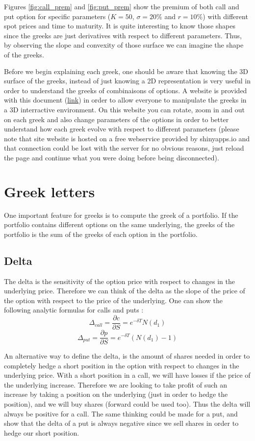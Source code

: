 \documentclass[hidelinks]{article}
\begin{document}
    
    Figures \ref{fig:call_prem} and \ref{fig:put_prem} show the premium of both call and put option for specific parameters ($K=50$, $\sigma=20\%$ and $r=10\%$) with different spot prices and time to maturity. It is quite interesting to know those shapes since the greeks are just derivatives with respect to different parameters. Thus, by observing the slope and convexity of those surface we can imagine the shape of the greeks. 
    
    Before we begin explaining each greek, one should be aware that knowing the 3D surface of the greeks, instead of just knowing a 2D representation is very useful in order to understand the greeks of combinaisons of options. A website is provided with this document (\href{https://maxencecoupet.shinyapps.io/options_greeks/}{link}) in order to allow everyone to manipulate the greeks in a 3D interractive environment. On this website you can rotate, zoom in and out on each greek and also change parameters of the options in order to better understand how each greek evolve with respect to different parameters (please note that site website is hosted on a free webservice provided by shinyapps.io and that connection could be lost with the server for no obvious reasons, just reload the page and continue what you were doing before being disconnected).
	
	\newpage
	\section{Greek letters}
	
	One important feature for greeks is to compute the greek of a portfolio. If the portfolio contains different options on the same underlying, the greeks of the portfolio is the sum of the greeks of each option in the portfolio.
	
	\subsection{Delta}
	
	The delta is the sensitivity of the option price with respect to changes in the underlying price. Therefore we can think of the delta as the slope of the price of the option with respect to the price of the underlying. One can show the following analytic formulas for calls and puts :
	$$ \Delta_{call}= \frac{\partial c}{\partial S} = e^{-\delta T} N(d_1)$$
	$$ \Delta_{put}= \frac{\partial p}{\partial S} =  e^{-\delta T}\left(N(d_1)-1\right)$$
	
	An alternative way to define the delta, is the amount of shares needed in order to completely hedge a short position in the option with respect to changes in the underlying price. With a short position in a call, we will have losses if the price of the underlying increase. Therefore we are looking to take profit of such an increase by taking a position on the underlying (just in order to hedge the position), and we will buy shares (forward could be used too). Thus the delta will always be positive for a call. The same thinking could be made for a put, and show that the delta of a put is always negative since we sell shares in order to hedge our short position. 
	
\end{document}
